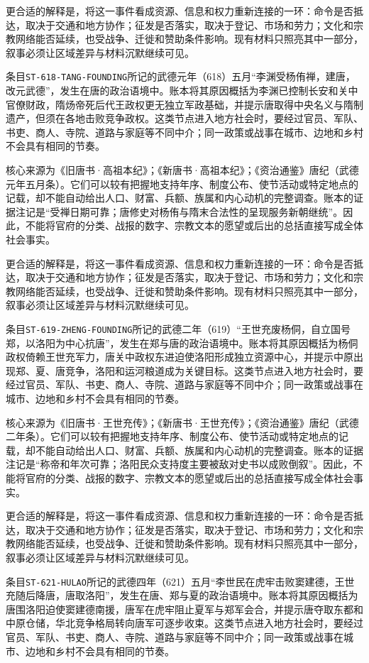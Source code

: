 更合适的解释是，将这一事件看成资源、信息和权力重新连接的一环：命令是否抵达，取决于交通和地方协作；征发是否落实，取决于登记、市场和劳力；文化和宗教网络能否延续，也受战争、迁徙和赞助条件影响。现有材料只照亮其中一部分，叙事必须让区域差异与材料沉默继续可见。

条目\texttt{ST-618-TANG-FOUNDING}所记的武德元年（618）五月“李渊受杨侑禅，建唐，改元武德”，发生在唐的政治语境中。账本将其原因概括为李渊已控制长安和关中官僚财政，隋炀帝死后代王政权更无独立军政基础，并提示唐取得中央名义与隋制遗产，但须在各地击败竞争政权。这类节点进入地方社会时，要经过官员、军队、书吏、商人、寺院、道路与家庭等不同中介；同一政策或战事在城市、边地和乡村不会具有相同的节奏。

核心来源为《旧唐书·高祖本纪》；《新唐书·高祖本纪》；《资治通鉴》唐纪（武德元年五月条）。它们可以较有把握地支持年序、制度公布、使节活动或特定地点的记载，却不能自动给出人口、财富、兵额、族属和内心动机的完整调查。账本的证据注记是“受禅日期可靠；唐修史对杨侑与隋末合法性的呈现服务新朝继统”。因此，不能将官府的分类、战报的数字、宗教文本的愿望或后出的总括直接写成全体社会事实。

更合适的解释是，将这一事件看成资源、信息和权力重新连接的一环：命令是否抵达，取决于交通和地方协作；征发是否落实，取决于登记、市场和劳力；文化和宗教网络能否延续，也受战争、迁徙和赞助条件影响。现有材料只照亮其中一部分，叙事必须让区域差异与材料沉默继续可见。

条目\texttt{ST-619-ZHENG-FOUNDING}所记的武德二年（619）“王世充废杨侗，自立国号郑，以洛阳为中心抗唐”，发生在郑与唐的政治语境中。账本将其原因概括为杨侗政权倚赖王世充军力，唐关中政权东进迫使洛阳形成独立资源中心，并提示中原出现郑、夏、唐竞争，洛阳和运河粮道成为关键目标。这类节点进入地方社会时，要经过官员、军队、书吏、商人、寺院、道路与家庭等不同中介；同一政策或战事在城市、边地和乡村不会具有相同的节奏。

核心来源为《旧唐书·王世充传》；《新唐书·王世充传》；《资治通鉴》唐纪（武德二年条）。它们可以较有把握地支持年序、制度公布、使节活动或特定地点的记载，却不能自动给出人口、财富、兵额、族属和内心动机的完整调查。账本的证据注记是“称帝和年次可靠；洛阳民众支持度主要被敌对史书以成败倒叙”。因此，不能将官府的分类、战报的数字、宗教文本的愿望或后出的总括直接写成全体社会事实。

更合适的解释是，将这一事件看成资源、信息和权力重新连接的一环：命令是否抵达，取决于交通和地方协作；征发是否落实，取决于登记、市场和劳力；文化和宗教网络能否延续，也受战争、迁徙和赞助条件影响。现有材料只照亮其中一部分，叙事必须让区域差异与材料沉默继续可见。

条目\texttt{ST-621-HULAO}所记的武德四年（621）五月“李世民在虎牢击败窦建德，王世充随后降唐，唐取洛阳”，发生在唐、郑与夏的政治语境中。账本将其原因概括为唐围洛阳迫使窦建德南援，唐军在虎牢阻止夏军与郑军会合，并提示唐夺取东都和中原仓储，华北竞争格局转向唐军可逐步收束。这类节点进入地方社会时，要经过官员、军队、书吏、商人、寺院、道路与家庭等不同中介；同一政策或战事在城市、边地和乡村不会具有相同的节奏。

